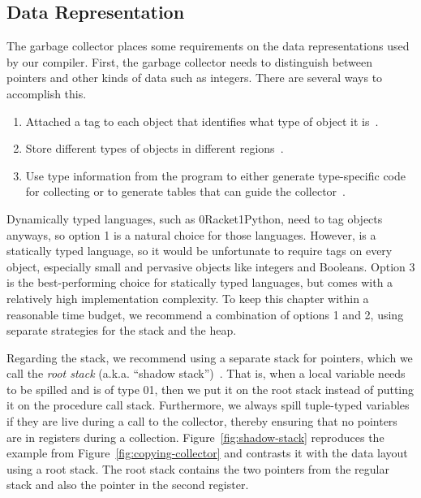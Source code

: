 \documentclass[7x10,nocrop]{TimesAPriori_MIT}%
\def\racketEd{0}
\def\pythonEd{1}
\def\edition{1}
\newcommand{\racket}[1]{{\if\edition\racketEd{#1}\fi}}
\newcommand{\python}[1]{{\if\edition\pythonEd #1\fi}}
\begin{document}
\subsection{Data Representation}
\label{sec:data-rep-gc}

The garbage collector places some requirements on the data
representations used by our compiler. First, the garbage collector
needs to distinguish between pointers and other kinds of data such as
integers. There are several ways to accomplish this.
\begin{enumerate}
\item Attached a tag to each object that identifies what type of
  object it is~\citep{McCarthy:1960dz}.
\item Store different types of objects in different
  regions~\citep{Steele:1977ab}.
\item Use type information from the program to either generate
  type-specific code for collecting or to generate tables that can
  guide the
  collector~\citep{Appel:1989aa,Goldberg:1991aa,Diwan:1992aa}.
\end{enumerate}
Dynamically typed languages, such as \racket{Racket}\python{Python},
need to tag objects anyways, so option 1 is a natural choice for those
languages.  However, \LangVec{} is a statically typed language, so it
would be unfortunate to require tags on every object, especially small
and pervasive objects like integers and Booleans.  Option 3 is the
best-performing choice for statically typed languages, but comes with
a relatively high implementation complexity. To keep this chapter
within a reasonable time budget, we recommend a combination of options
1 and 2, using separate strategies for the stack and the heap.

Regarding the stack, we recommend using a separate stack for pointers,
which we call the \emph{root stack}
(a.k.a. ``shadow
stack'')~\citep{Siebert:2001aa,Henderson:2002aa,Baker:2009aa}. That
is, when a local variable needs to be spilled and is of type
\racket{}\python{}, then we put it on the
root stack instead of putting it on the procedure call
stack. Furthermore, we always spill tuple-typed variables if they are
live during a call to the collector, thereby ensuring that no pointers
are in registers during a collection. Figure~\ref{fig:shadow-stack}
reproduces the example from Figure~\ref{fig:copying-collector} and
contrasts it with the data layout using a root stack. The root stack
contains the two pointers from the regular stack and also the pointer
in the second register.
\end{document}
